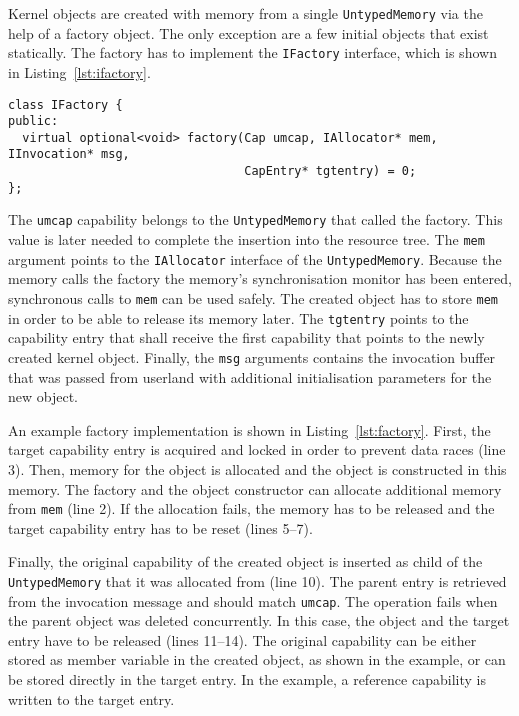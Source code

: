 Kernel objects are created with memory from a single
\texttt{UntypedMemory} via the help of a factory object.  The only
exception are a few initial objects that exist statically.  The
factory has to implement the \texttt{IFactory} interface, which is
shown in Listing~\ref{lst:ifactory}. 

\begin{lstlisting}[float, label=lst:ifactory, caption=The \texttt{IFactory} interface.]
class IFactory {
public:
  virtual optional<void> factory(Cap umcap, IAllocator* mem, IInvocation* msg,
                                 CapEntry* tgtentry) = 0;
};
\end{lstlisting}

The \texttt{umcap} capability belongs to the \texttt{UntypedMemory}
that called the factory.  This value is later needed to complete the
insertion into the resource tree.  The \texttt{mem} argument points to
the \texttt{IAllocator} interface of the \texttt{UntypedMemory}.
Because the memory calls the factory the memory's synchronisation
monitor has been entered, synchronous calls to \texttt{mem} can be
used safely.  The created object has to store \texttt{mem} in order to
be able to release its memory later.  The \texttt{tgtentry} points to
the capability entry that shall receive the first capability that
points to the newly created kernel object.  Finally, the \texttt{msg}
arguments contains the invocation buffer that was passed from userland
with additional initialisation parameters for the new object.

An example factory implementation is shown in
Listing~\ref{lst:factory}.  First, the target capability entry is
acquired and locked in order to prevent data races (line 3).  Then,
memory for the object is allocated and the object is constructed in
this memory.  The factory and the object constructor can allocate
additional memory from \texttt{mem} (line 2).  If the allocation
fails, the memory has to be released and the target capability entry
has to be reset (lines 5--7).

Finally, the original capability of the created object is inserted as
child of the \texttt{UntypedMemory} that it was allocated from (line
10).  The parent entry is retrieved from the invocation message and
should match \texttt{umcap}.  The operation fails when the parent
object was deleted concurrently.  In this case, the object and the
target entry have to be released (lines 11--14).  The original
capability can be either stored as member variable in the created
object, as shown in the example, or can be stored directly in the
target entry.  In the example, a reference capability is written to the
target entry.

